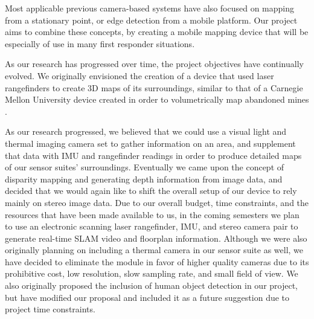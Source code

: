 Most applicable previous camera-based systems have also focused on mapping from a stationary point, or edge detection from a mobile platform. Our project aims to combine these concepts, by creating a mobile mapping device that will be especially of use in many first responder situations.
\par
As our research has progressed over time, the project objectives have continually evolved. We originally envisioned the creation of a device that used laser rangefinders to create 3D maps of its surroundings, similar to that of a Carnegie Mellon University device created in order to volumetrically map abandoned mines \cite{thrun}.
\par
As our research progressed, we believed that we could use a visual light and thermal imaging camera set to gather information on an area, and supplement that data with IMU and rangefinder readings in order to produce detailed maps of our sensor suites’ surroundings. Eventually we came upon the concept of disparity mapping and generating depth information from image data, and decided that we would again like to shift the overall setup of our device to rely mainly on stereo image data. Due to our overall budget, time constraints, and the resources that have been made available to us, in the coming semesters we plan to use an electronic scanning laser rangefinder, IMU, and stereo camera pair to generate real-time SLAM video and floorplan information. Although we were also originally planning on including a thermal camera in our sensor suite as well, we have decided to eliminate the module in favor of higher quality cameras due to its prohibitive cost, low resolution, slow sampling rate, and small field of view. We also originally proposed the inclusion of human object detection in our project, but have modified our proposal and included it as a future suggestion due to project time constraints.